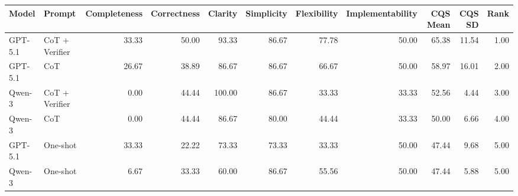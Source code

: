 \begin{tabular}{llrrrrrrrrr}
\toprule
Model & Prompt & Completeness & Correctness & Clarity & Simplicity & Flexibility & Implementability & CQS Mean & CQS SD & Rank \\
\midrule
GPT-5.1 & CoT + Verifier & 33.33 & 50.00 & 93.33 & 86.67 & 77.78 & 50.00 & 65.38 & 11.54 & 1.00 \\
GPT-5.1 & CoT & 26.67 & 38.89 & 86.67 & 86.67 & 66.67 & 50.00 & 58.97 & 16.01 & 2.00 \\
Qwen-3 & CoT + Verifier & 0.00 & 44.44 & 100.00 & 86.67 & 33.33 & 33.33 & 52.56 & 4.44 & 3.00 \\
Qwen-3 & CoT & 0.00 & 44.44 & 86.67 & 80.00 & 44.44 & 33.33 & 50.00 & 6.66 & 4.00 \\
GPT-5.1 & One-shot & 33.33 & 22.22 & 73.33 & 73.33 & 33.33 & 50.00 & 47.44 & 9.68 & 5.00 \\
Qwen-3 & One-shot & 6.67 & 33.33 & 60.00 & 86.67 & 55.56 & 50.00 & 47.44 & 5.88 & 5.00 \\
\bottomrule
\end{tabular}
